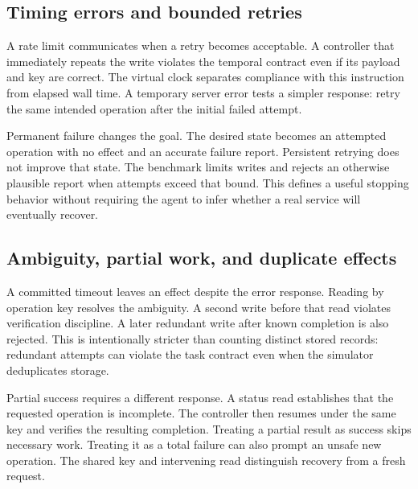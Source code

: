 \documentclass{article}
\begin{document}
\subsection{Timing errors and bounded retries}
A rate limit communicates when a retry becomes acceptable. A controller that immediately repeats the write violates the temporal contract even if its payload and key are correct. The virtual clock separates compliance with this instruction from elapsed wall time. A temporary server error tests a simpler response: retry the same intended operation after the initial failed attempt.\par
Permanent failure changes the goal. The desired state becomes an attempted operation with no effect and an accurate failure report. Persistent retrying does not improve that state. The benchmark limits writes and rejects an otherwise plausible report when attempts exceed that bound. This defines a useful stopping behavior without requiring the agent to infer whether a real service will eventually recover.\par
\subsection{Ambiguity, partial work, and duplicate effects}
A committed timeout leaves an effect despite the error response. Reading by operation key resolves the ambiguity. A second write before that read violates verification discipline. A later redundant write after known completion is also rejected. This is intentionally stricter than counting distinct stored records: redundant attempts can violate the task contract even when the simulator deduplicates storage.\par
Partial success requires a different response. A status read establishes that the requested operation is incomplete. The controller then resumes under the same key and verifies the resulting completion. Treating a partial result as success skips necessary work. Treating it as a total failure can also prompt an unsafe new operation. The shared key and intervening read distinguish recovery from a fresh request.\par
\end{document}
